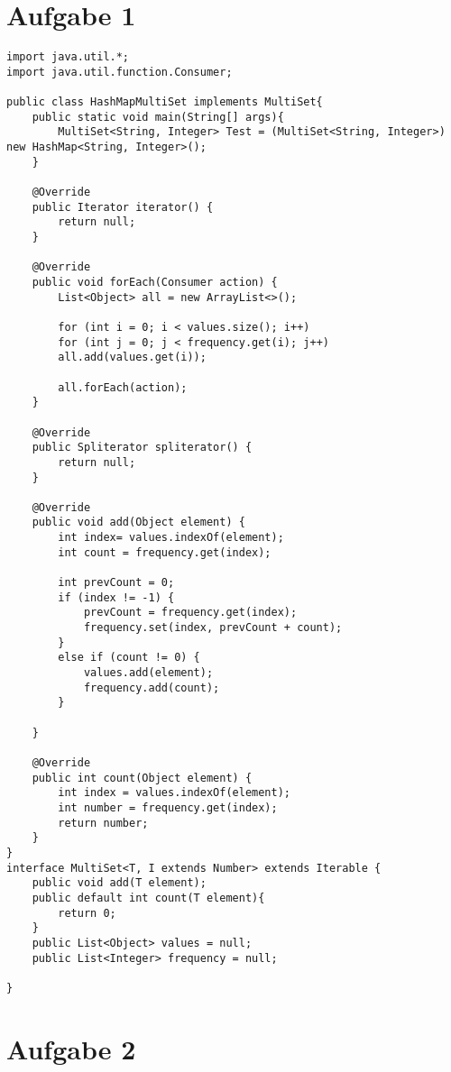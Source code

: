 \documentclass[12pt,a4paper,oneside,ngerman]{article}
\begin{document}

\section*{Aufgabe 1}
\begin{lstlisting}
import java.util.*;
import java.util.function.Consumer;

public class HashMapMultiSet implements MultiSet{
    public static void main(String[] args){
        MultiSet<String, Integer> Test = (MultiSet<String, Integer>) new HashMap<String, Integer>();
    }

    @Override
    public Iterator iterator() {
        return null;
    }

    @Override
    public void forEach(Consumer action) {
        List<Object> all = new ArrayList<>();

        for (int i = 0; i < values.size(); i++)
        for (int j = 0; j < frequency.get(i); j++)
        all.add(values.get(i));

        all.forEach(action);
    }

    @Override
    public Spliterator spliterator() {
        return null;
    }

    @Override
    public void add(Object element) {
        int index= values.indexOf(element);
        int count = frequency.get(index);

        int prevCount = 0;
        if (index != -1) {
            prevCount = frequency.get(index);
            frequency.set(index, prevCount + count);
        }
        else if (count != 0) {
            values.add(element);
            frequency.add(count);
        }

    }

    @Override
    public int count(Object element) {
        int index = values.indexOf(element);
        int number = frequency.get(index);
        return number;
    }
}
interface MultiSet<T, I extends Number> extends Iterable {
    public void add(T element);
    public default int count(T element){
        return 0;
    }
    public List<Object> values = null;
    public List<Integer> frequency = null;

}

\end{lstlisting}

\section*{Aufgabe 2}
\end{document}
